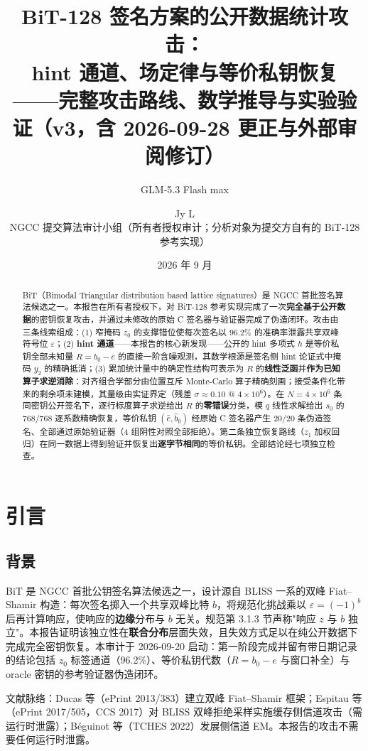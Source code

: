 \documentclass[11pt,a4paper]{ctexart}
\title{\bfseries BiT-128 签名方案的公开数据统计攻击：\\
hint 通道、场定律与等价私钥恢复\\[0.4em]
\large ——完整攻击路线、数学推导与实验验证（v3，含 2026-09-28 更正与外部审阅修订）}
\author{GLM-5.3 Flash max \and Jy L\\[0.3em]\small NGCC 提交算法审计小组（所有者授权审计；分析对象为提交方自有的 BiT-128 参考实现）}
\date{2026 年 9 月}
\begin{document}
\maketitle

\begin{abstract}
BiT（Bimodal Triangular distribution based lattice signatures）是 NGCC 首批签名算法候选之一。本报告在所有者授权下，对 BiT-128 参考实现完成了一次\textbf{完全基于公开数据}的密钥恢复攻击，并通过未修改的原始 C 签名器与验证器完成了伪造闭环。攻击由三条线索组成：(1) 窄掩码 $z_0$ 的支撑错位使每次签名以 $96.2\%$ 的准确率泄露共享双峰符号位 $\varepsilon$；(2) \textbf{hint 通道}——本报告的核心新发现——公开的 hint 多项式 $h$ 是等价私钥全部未知量 $R = b_0 - e$ 的直接一阶含噪观测，其数学根源是签名侧 hint 论证式中掩码 $y_2$ 的精确抵消；(3) 累加统计量中的确定性结构可表示为 $R$ 的\textbf{线性泛函}并\textbf{作为已知算子求逆消除}：对齐组合学部分由位置互斥 Monte-Carlo 算子精确刻画；接受条件化带来的剩余项未建模，其量级由实证界定（残差 $\sigma\approx0.10$ @ $4\times10^6$）。在 $N = 4\times 10^6$ 条同密钥公开签名下，逐行标度算子求逆给出 $R$ 的\textbf{零错误}分类，模 $q$ 线性求解给出 $s_0$ 的 768/768 逐系数精确恢复，等价私钥 $(\hat e,\hat b_0)$ 经原始 C 签名器产生 20/20 条伪造签名、全部通过原始验证器（4 组阴性对照全部拒绝）。第二条独立恢复路线（$z_1$ 加权回归）在同一数据上得到验证并恢复出\textbf{逐字节相同}的等价私钥。全部结论经七项独立检查。
\end{abstract}

\tableofcontents
\newpage

\section{引言}

\subsection{背景}

BiT 是 NGCC 首批公钥签名算法候选之一，设计源自 BLISS 一系的双峰 Fiat--Shamir 构造：每次签名掷入一个共享双峰比特 $b$，将规范化挑战乘以 $\varepsilon = (-1)^b$ 后再计算响应，使响应的\textbf{边缘}分布与 $b$ 无关。规范第 3.1.3 节声称"响应 $z$ 与 $b$ 独立"。本报告证明该独立性在\textbf{联合分布}层面失效，且失效方式足以在纯公开数据下完成完全密钥恢复。本审计于 2026-09-20 启动：第一阶段完成并留有带日期记录的结论包括 $z_0$ 标签通道（96.2\%）、等价私钥代数（$R = b_0 - e$ 与窗口补全）与 oracle 密钥的参考验证器伪造闭环。

文献脉络：Ducas 等（ePrint 2013/383）建立双峰 Fiat--Shamir 框架；Espitau 等（ePrint 2017/505，CCS 2017）对 BLISS 双峰拒绝采样实施缓存侧信道攻击（需运行时泄露）；Béguinot 等（TCHES 2022）发展侧信道 EM。本报告的攻击不需要任何运行时泄露。
\end{document}
